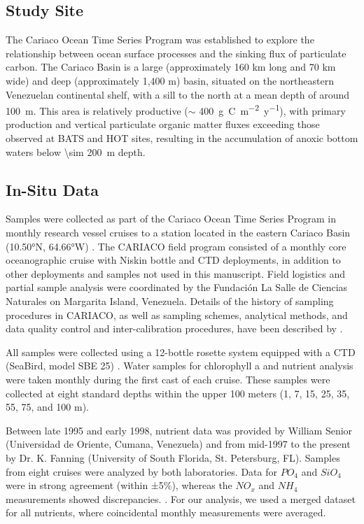 \documentclass[draft]{agujournal2019}
\begin{document}
\subsection{Study Site}
    The Cariaco Ocean Time Series Program was established to explore the relationship between ocean surface processes and the sinking flux of particulate carbon. The Cariaco Basin is a large (approximately 160 km long and 70 km wide) and deep (approximately 1,400 m) basin, situated on the northeastern Venezuelan continental shelf, with a sill to the north at a mean depth of around \qty{100}{m}. This area is relatively productive ($\sim$ \qty{400}{g.C.m^{-2}.y^{-1}}), with primary production and vertical particulate organic matter fluxes exceeding those observed at BATS and HOT sites, resulting in the accumulation of anoxic bottom waters below \qty{\sim 200}{m} depth.

\subsection{In-Situ Data}
    Samples were collected as part of the Cariaco Ocean Time Series Program in monthly research vessel cruises to a station located in the eastern Cariaco Basin (\ang{10.50}N, \ang{64.66}W) \cite{muller-karger_scientific_2019}.
    The CARIACO field program consisted of a monthly core oceanographic cruise with Niskin bottle and CTD deployments, in addition to other deployments and samples not used in this manuscript. Field logistics and partial sample analysis were coordinated by the Fundación La Salle de Ciencias Naturales on Margarita Island, Venezuela. Details of the history of sampling procedures in CARIACO, as well as sampling schemes, analytical methods, and data quality control and inter-calibration procedures, have been described by . 
    
    All samples were collected using a 12-bottle rosette system equipped with a CTD (SeaBird, model SBE 25) \cite{astor_yrene_m_handbook_2013}. Water samples for chlorophyll a and nutrient analysis were taken monthly during the first cast of each cruise. These samples were collected at eight standard depths within the upper 100 meters (1, 7, 15, 25, 35, 55, 75, and 100 m). 

    
    Between late 1995 and early 1998, nutrient data was provided by William Senior (Universidad de Oriente, Cumana, Venezuela) and from mid-1997 to the present by Dr. K. Fanning (University of South Florida, St. Petersburg, FL). Samples from eight cruises were analyzed by both laboratories. Data for $PO_4$ and $SiO_4$ were in strong agreement (within ±5\%), whereas the $NO_x$ and $NH_4$ measurements showed discrepancies. \cite{taylor_ecosystem_2012}. For our analysis, we used a merged dataset for all nutrients, where coincidental monthly measurements were averaged.
       
\end{document}
